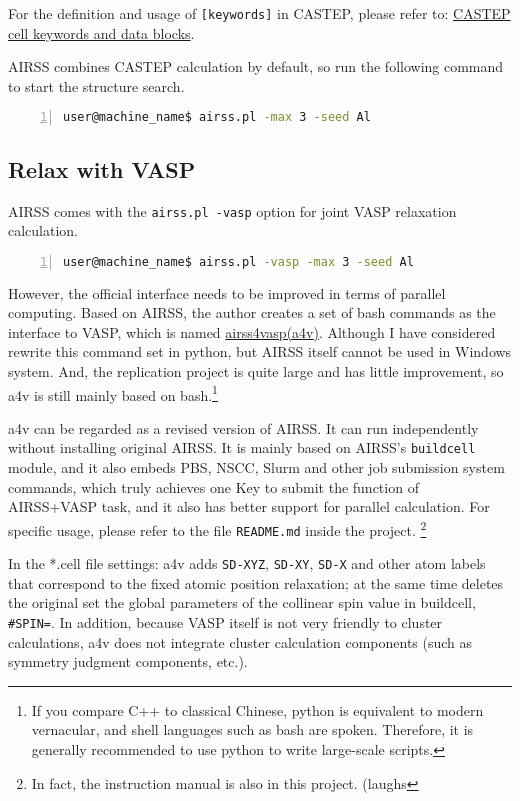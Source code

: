 \documentclass[a4paper, 10pt]{article}
\begin{document}
For the definition and usage of \verb|[keywords]| in CASTEP, please refer to: \href{http://www.tcm.phy.cam.ac.uk/castep/documentation/WebHelp/content/modules/castep/keywords/k_main_structure.htm}{CASTEP cell keywords and data blocks}.

AIRSS combines CASTEP calculation by default, so run the following command to start the structure search.
\begin{lstlisting}[language={bash},numbers=left]
user@machine_name$ airss.pl -max 3 -seed Al
\end{lstlisting}

\subsection{Relax with VASP}
AIRSS comes with the \verb|airss.pl -vasp| option for joint VASP relaxation calculation. 
\begin{lstlisting}[language={bash},numbers=left]
user@machine_name$ airss.pl -vasp -max 3 -seed Al
\end{lstlisting}

However, the official interface needs to be improved in terms of parallel computing. Based on AIRSS, the author creates a set of bash commands as the interface to VASP, which is named \href{https://github.com/kYangLi/airss4vasp}{airss4vasp(a4v)}. Although I have considered rewrite this command set in python, but AIRSS itself cannot be used in Windows system. And, the replication project is quite large and has little improvement, so a4v is still mainly based on bash.\footnote{If you compare C++ to classical Chinese, python is equivalent to modern vernacular, and shell languages such as bash are spoken. Therefore, it is generally recommended to use python to write large-scale scripts.}

a4v can be regarded as a revised version of AIRSS. It can run independently without installing original AIRSS. It is mainly based on AIRSS's \verb|buildcell| module, and it also embeds PBS, NSCC, Slurm and other job submission system commands, which truly achieves one Key to submit the function of AIRSS+VASP task, and it also has better support for parallel calculation. For specific usage, please refer to the file \verb|README.md| inside the project. \footnote{In fact, the instruction manual is also in this project. (laughs}

In the *.cell file settings: a4v adds \verb|SD-XYZ|, \verb|SD-XY|, \verb|SD-X| and other atom labels that correspond to the fixed atomic position relaxation; at the same time deletes the original set the global parameters of the collinear spin value in buildcell, \verb|#SPIN=|. In addition, because VASP itself is not very friendly to cluster calculations, a4v does not integrate cluster calculation components (such as symmetry judgment components, etc.).
\end{document}
